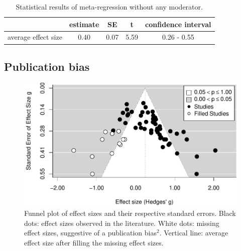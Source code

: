 \documentclass[
  english,
  man]{apa6}
\begin{document}
\begin{table}[tbp]

\begin{center}
\begin{threeparttable}

\caption{\label{tab:Table1}Statistical results of meta-regression without any moderator.}

\begin{tabular}{lcccc}
\toprule
 & estimate & SE & t & confidence interval\\
\midrule
average effect size & 0.40 & 0.07 & 5.59 & 0.26 - 0.55\\
\bottomrule
\end{tabular}

\end{threeparttable}
\end{center}

\end{table}

\hypertarget{publication-bias}{%
\subsection{Publication bias}\label{publication-bias}}

\begin{figure}
\centering
\includegraphics{MA_speech_pref_files/figure-latex/bias-1.pdf}
\caption{\label{fig:bias}Funnel plot of effect sizes and their respective standard errors. Black dots: effect sizes observed in the literature. White dots: missing effect sizes, suggestive of a publication bias\(^2\). Vertical line: average effect size after filling the missing effect sizes.}
\end{figure}
\end{document}
